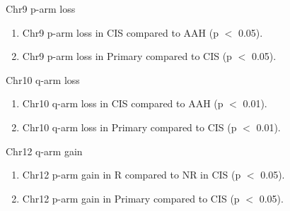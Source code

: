 \documentclass{beamer}
\begin{document}
\begin{frame}[allowframebreaks]
        \begin{block}{Chr9 p-arm loss}
            \begin{enumerate}
                \item Chr9 p-arm loss in CIS compared to AAH (p $<$ 0.05).
                \item Chr9 p-arm loss in Primary compared to CIS (p $<$ 0.05).
            \end{enumerate}

            \begin{table}
                \caption{CGC Tier1 genes in Chr9 p-arm}
                \resizebox{\linewidth}{!}
                {}
            \end{table}
        \end{block}

        \begin{block}{Chr10 q-arm loss}
            \begin{enumerate}
                \item Chr10 q-arm loss in CIS compared to AAH (p $<$ 0.01).
                \item Chr10 q-arm loss in Primary compared to CIS (p $<$ 0.01).
            \end{enumerate}

            \begin{table}
                \caption{CGC Tier1 genes in Chr10 q-arm}
                \resizebox{\linewidth}{!}
                {}
            \end{table}
        \end{block}

        \begin{block}{Chr12 q-arm gain}
            \begin{enumerate}
                \item Chr12 p-arm gain in R compared to NR in CIS (p $<$ 0.05).
                \item Chr12 p-arm gain in Primary compared to CIS (p $<$ 0.05).
            \end{enumerate}

            \begin{table}
                \caption{CGC Tier1 genes in Chr12 p-arm}
                \resizebox{\linewidth}{!}
                {}
            \end{table}
        \end{block}


\end{frame}
\end{document}
